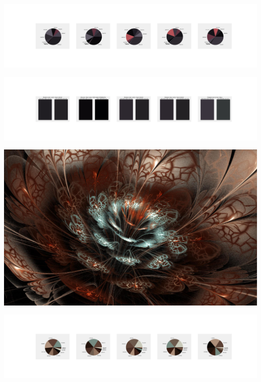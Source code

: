 \documentclass[11pt]{article}
\begin{document}
\begin{landscape}
    \begin{center}
    \includegraphics[width=250mm]{./nbimg/pie-405.jpg}
    \end{center}

    \begin{center}
    \includegraphics[width=250mm]{./nbimg/peak-405.jpg}
    \end{center}
    

    \begin{center}
    \includegraphics[width=\textwidth]{./nbimg/file (59).jpg}
    \end{center}

    \begin{center}
    \includegraphics[width=250mm]{./nbimg/pie-406.jpg}
    \end{center}


\end{landscape}
\end{document}
